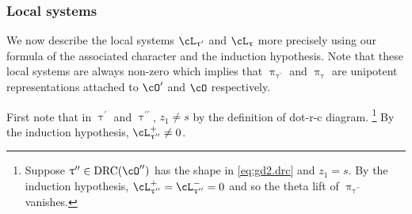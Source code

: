\documentclass[12pt,a4paper]{amsart}
\numberwithin{equation}{section}
\theoremstyle{remark}
\def\bsign{{}^b\mathrm{Sign}}
\def\drc{\mathrm{DRC}}
\let\ytb=\ytableaushort
\def\cOp{\cO^{\prime}}
\def\cOpp{\cO^{\prime\prime}}
\def\pcL{\cL^+}
\def\ncL{\cL^-}
\def\pcB{\cB^+}
\def\ncB{\cB^-}
\def\uptaup{\uptau^{\prime}}
\def\uptaupp{\uptau^{\prime\prime}}
\begin{document}



%



\subsubsection{Local systems}
We now describe the local systems $\cL_{\uptaup}$ and $\cL_{\uptau}$ more
precisely using our formula of the associated character and the induction
hypothesis. Note that these local systems are always non-zero which implies that
$\uppi_{\uptaup}$ and $\uppi_{\uptau}$ are unipotent representations attached to
$\cOp$ and $\cO$ respectively.

First note that in $\uptaup$ and $\uptaupp$, $z_{1}\neq s$ by the definition of
dot-r-c diagram.
\footnote{
  Suppose $\uptaupp\in \drc(\cOpp)$ has the shape in \eqref{eq:gd2.drc} and
  $z_{1}=s$. By the induction hypothesis,   $\pcL_{\uptaupp}=\ncL_{\uptaupp}=0$ and so
  the theta lift of $\uppi_{\uptaupp}$ vanishes.
}
By the induction hypothesis, $\cL_{\uptaupp}^{+}\neq 0$.
\end{document}
